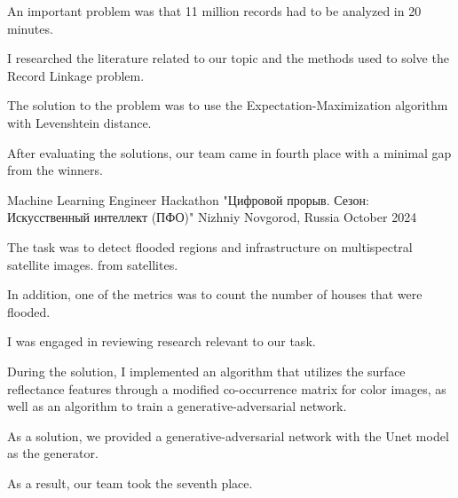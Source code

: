 \begin{cventries}
{\begin{cvitems}
    \item {An important problem was that 11 million records had to be analyzed in 20 minutes. }
    \item {I researched the literature related to our topic and the methods used to solve the Record Linkage problem. } 
    \item {The solution to the problem was to use the Expectation-Maximization algorithm with Levenshtein distance. }
    \item {After evaluating the solutions, our team came in fourth place with a minimal gap from the winners. }
  \end{cvitems}
}
\cventry
{Machine Learning Engineer} %
{Hackathon "Цифровой прорыв. Сезон: Искусственный интеллект (ПФО)"} %
{Nizhniy Novgorod, Russia} %
{October 2024} %
{
  \begin{cvitems} %
    \item {The task was to detect flooded regions and infrastructure on multispectral satellite images. from satellites. }
    \item {In addition, one of the metrics was to count the number of houses that were flooded. }
    \item {I was engaged in reviewing research relevant to our task. } 
    \item {During the solution, I implemented an algorithm that utilizes the surface reflectance features through a modified co-occurrence matrix for color images, as well as an algorithm to train a generative-adversarial network. }
    \item {As a solution, we provided a generative-adversarial network with the Unet model as the generator. } 
    \item {As a result, our team took the seventh place.}
  \end{cvitems}
}
\end{cventries}
